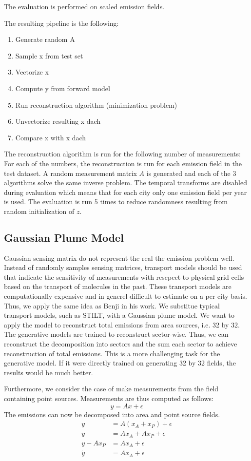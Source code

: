 The evaluation is performed on scaled emission fields.

The resulting pipeline is the following:
\begin{enumerate}
    \item Generate random A
    \item Sample x from test set
    \item Vectorize x
    \item Compute y from forward model
    \item Run reconstruction algorithm (minimization problem)
    \item Unvectorize resulting x dach
    \item Compare x with x dach
\end{enumerate}

The reconstruction algorithm is run for the following number of measurements:
For each of the numbers, the reconstruction is run for each emission field in the test dataset.
A random measurement matrix $A$ is generated and each of the $3$ algorithms solve the same inverse problem.
The temporal transforms are disabled during evaluation which means that for each city only one emission field per year is used.
The evaluation is run 5 times to reduce randomness resulting from random initialization of $z$.

\subsection{Gaussian Plume Model}
Gaussian sensing matrix do not represent the real the emission problem well.
Instead of randomly samples sensing matrices, transport models should be used that indicate the sensitivity of measurements with resepect to physical grid cells based on the transport of molecules in the past.
These transport models are computationally expensive and in generel difficult to estimate on a per city basis.
Thus, we apply the same idea as Benji in his work.
We substitue typical transport models, such as STILT, with a Gaussian plume model.
We want to apply the model to reconstruct total emissions from area sources, i.e. 32 by 32.
The generative models are trained to reconstruct sector-wise.
Thus, we can reconstruct the decomposition into sectors and the sum each sector to achieve reconstruction of total emissions.
This is a more challenging task for the generative model.
If it were directly trained on generating 32 by 32 fields, the results would be much better.

Furthermore, we consider the case of make measurements from the field containing point sources.
Measurements are thus computed as follows:
\begin{equation}
    y = A x + \epsilon
\end{equation}
The emissions can now be decomposed into area and point source fields.
\begin{align}
    y &= A (x_A + x_P) + \epsilon \\
    y &= A x_A + A x_P + \epsilon \\
    y - A x_P &= A x_A + \epsilon \\
    \tilde{y} &= A x_A + \epsilon
\end{align}

